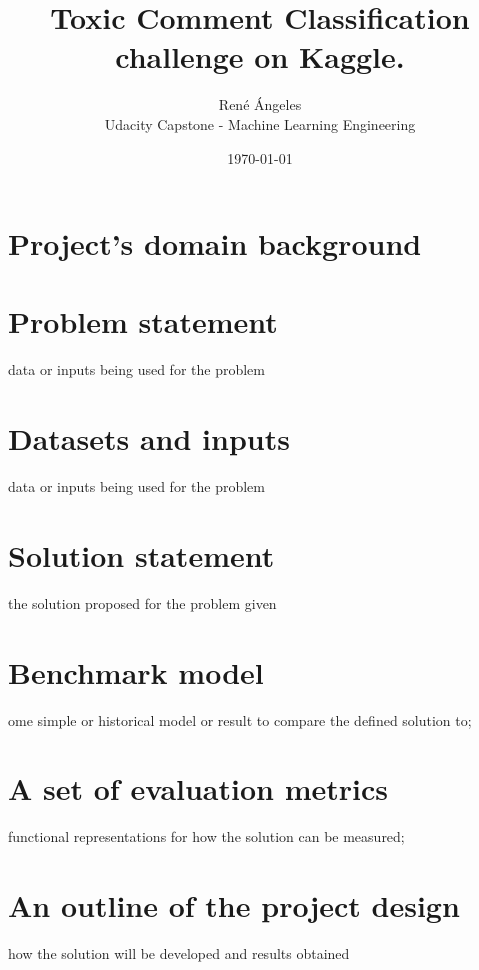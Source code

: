 \documentclass[book,preprintnumbers,11pt]{article}
\begin{document}
\title{Toxic Comment Classification challenge on Kaggle.}
\author{Ren\'e  \'Angeles\\
  Udacity Capstone - Machine Learning Engineering \\
  }
\date{\today}
\maketitle









\section{Project's domain background}


\section{Problem statement}
data or inputs being used for the problem

\section{Datasets and inputs}
data or inputs being used for the problem

\section{Solution statement}
 the solution proposed for the problem given
 
\section{Benchmark model}
ome simple or historical model or result to compare the defined solution to;

\section{A set of evaluation metrics}
functional representations for how the solution can be measured;

\section{An outline of the project design}
 how the solution will be developed and results obtained
\end{document}
